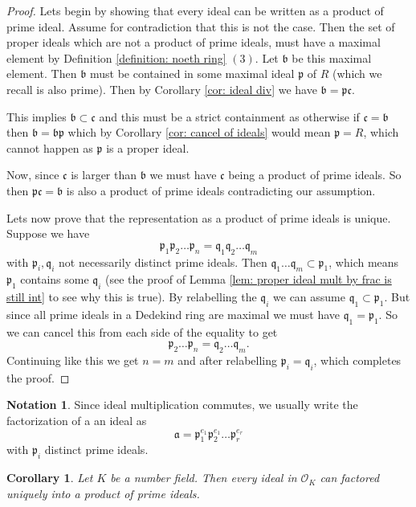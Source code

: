 \documentclass[11pt,a4paper]{report}
\theoremstyle{plain}
\newtheorem{cor}[subsection]{Corollary}
\theoremstyle{definition}
\theoremstyle{definition}
\newtheorem{nota}[subsection]{Notation}
\def\gothb{\mathfrak{b}}
\def\gothc{\mathfrak{c}}
\def\gothp{\mathfrak{p}}
\def\gothq{\mathfrak{q}}
\def \OO {\mathcal{O}}
\def\gotha{\mathfrak{a}}
\begin{document}
	\begin{proof}
		Lets begin by showing that every ideal can be written as a product of prime ideal. Assume for contradiction that this is not the case. Then the set of proper ideals which are not a product of prime ideals, must have a maximal element by Definition \ref{definition: noeth ring} $(3)$. Let $\gothb$ be this maximal element. Then $\gothb$ must be contained in some maximal ideal $\gothp$ of $R$ (which we recall is also prime). Then by Corollary \ref{cor: ideal div} we have $\gothb=\gothp \gothc$. 
		
		This implies $\gothb \subset \gothc$ and this must be a strict containment as otherwise if $\gothc=\gothb$ then $\gothb=\gothb\gothp$ which by Corollary \ref{cor: cancel of ideals}  would mean $\gothp=R$, which cannot happen as $\gothp$ is a proper ideal. 
		
		Now, since $\gothc$ is larger than $\gothb$ we must have $\gothc$ being a product of prime ideals. So then $\gothp\gothc=\gothb$ is also a product of prime ideals contradicting our assumption. 
		
		Lets now prove that the representation as a product of prime ideals is unique. Suppose we have \[\gothp_1\gothp_2\dots\gothp_n=\gothq_1\gothq_2\dots\gothq_m\] with $\gothp_i,\gothq_i$ not necessarily distinct prime ideals. Then $\gothq_1\dots\gothq_m  \subset \gothp_1$, which means $\gothp_1$ contains some $\gothq_i$  (see the proof of Lemma \ref{lem: proper ideal mult by frac is still int} to see why this is true). By relabelling the $\gothq_i$ we can assume $\gothq_1 \subset \gothp_1$. But since all prime ideals in a Dedekind ring are maximal we must have $\gothq_1=\gothp_1$. So we can cancel this from each side of the equality to get \[\gothp_2\dots\gothp_n=\gothq_2\dots\gothq_m.\] Continuing like this we get $n=m$ and after relabelling $\gothp_i=\gothq_i$, which completes the proof.
		
		
		
		
	\end{proof}
	
	\begin{nota}
		Since ideal multiplication commutes, we usually write the factorization of a an ideal as \[\gotha=\gothp_1^{e_1}\gothp_2^{e_1}\dots\gothp_r^{e_r}\] with $\gothp_i$ distinct prime ideals. 
	\end{nota}
	
	\begin{cor}
		Let $K$ be a number field. Then every ideal in $\OO_K$ can factored uniquely into a product of prime ideals.
	\end{cor}
	
\end{document}
